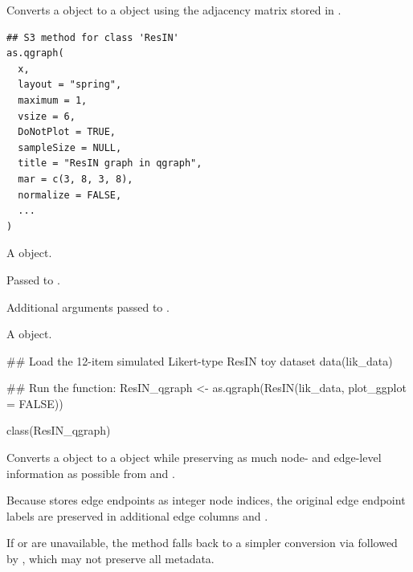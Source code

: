 \documentclass[a4paper]{book}
\begin{document}
%
\begin{Description}
Converts a  object to a  object using the adjacency
matrix stored in .
\end{Description}
%
\begin{Usage}
\begin{verbatim}
## S3 method for class 'ResIN'
as.qgraph(
  x,
  layout = "spring",
  maximum = 1,
  vsize = 6,
  DoNotPlot = TRUE,
  sampleSize = NULL,
  title = "ResIN graph in qgraph",
  mar = c(3, 8, 3, 8),
  normalize = FALSE,
  ...
)
\end{verbatim}
\end{Usage}
%
\begin{Arguments}
\begin{ldescription}
\item[\code{x}] A  object.

\item[\code{layout}, \code{maximum}, \code{vsize}, \code{DoNotPlot}, \code{sampleSize}, \code{title}, \code{mar}, \code{normalize}] Passed to .

\item[\code{...}] Additional arguments passed to .
\end{ldescription}
\end{Arguments}
%
\begin{Value}
A  object.
\end{Value}
%
\begin{Examples}
\begin{ExampleCode}
## Load the 12-item simulated Likert-type ResIN toy dataset
data(lik_data)

## Run the function:
ResIN_qgraph <-  as.qgraph(ResIN(lik_data, plot_ggplot = FALSE))

class(ResIN_qgraph)

\end{ExampleCode}
\end{Examples}
%
\begin{Description}
Converts a  object to a  object while
preserving as much node- and edge-level information as possible from
 and .

Because  stores edge endpoints as integer node indices, the
original edge endpoint labels are preserved in additional edge columns
 and .

If  or  are unavailable, the method
falls back to a simpler conversion via  followed by
, which may not preserve all metadata.
\end{Description}
\end{document}
